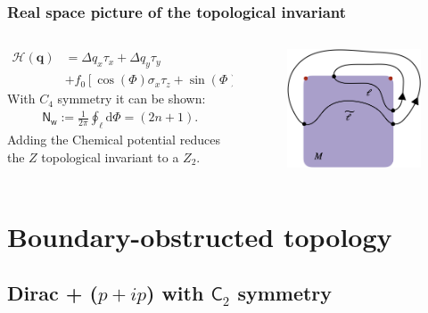 \documentclass{beamer}
\newcommand{\ms}{\mathsf}
\renewcommand{\(}{\left(}
\renewcommand{\)}{\right)}
\renewcommand{\[}{\left[}
\renewcommand{\]}{\right]}
\begin{document}
\begin{frame}
    \frametitle{Real space picture of the topological invariant}
    \begin{columns}
        \begin{column}{0.6\textwidth}
            \begin{align*}
                \mathcal H(\bm{q})&=\Delta q_{x}\tau_x + \Delta q_{y}\tau_y\\ &+ f_0 \left[ \cos (\Phi) \sigma_x \tau_z +\sin(\Phi) \sigma_z \tau_z \right]
            \end{align*}
            With $C_4$ symmetry it can be shown: 
            \begin{align*}
                \mathsf{N}_{\mathsf{w}}:=\frac{1}{2\pi}\oint_{\ell} \mathrm{d}\Phi = (2n + 1).
            \end{align*}
            Adding the Chemical potential reduces the $Z$ topological invariant to a $Z_2$. 
        \end{column}
        \begin{column}{0.4\textwidth}
            \begin{figure}[]
                \centering
                \includegraphics[scale=0.3]{Real_space_path.png}
            \end{figure}
        \end{column}
    \end{columns}

\end{frame}


\section{Boundary-obstructed topology}
\subsection{Dirac + \texorpdfstring{($p+ip$)}{} with \texorpdfstring{$\ms{C}_2$}{} symmetry}
\end{document}
